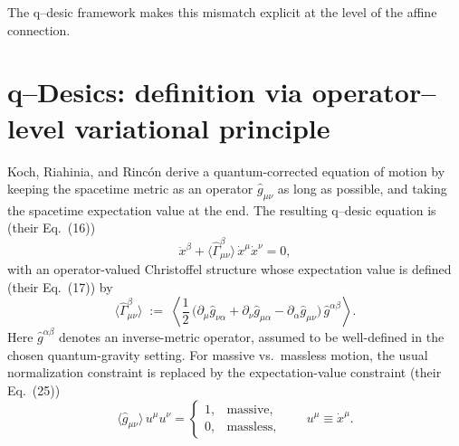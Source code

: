 \documentclass[11pt,a4paper]{article}
\theoremstyle{thmstyleone}
\theoremstyle{thmstyletwo}
\theoremstyle{thmstylethree}
\begin{document}
            The q--desic framework makes this mismatch explicit at the level of the affine connection.

        \section{q--Desics: definition via operator--level variational principle}
            Koch, Riahinia, and Rinc\'on derive a quantum-corrected equation of motion by keeping the spacetime metric as an operator
            $\hat g_{\mu\nu}$ as long as possible, and taking the spacetime expectation value at the end.
            The resulting q--desic equation is (their Eq.\ (16))
            \begin{equation}
                \ddot x^\beta + \big\langle \hat\Gamma^\beta_{\mu\nu}\big\rangle\,\dot x^\mu \dot x^\nu = 0,
                \label{eq:qdesic}
            \end{equation}
            with an operator-valued Christoffel structure whose expectation value is defined (their Eq.\ (17)) by
            \begin{equation}
                \big\langle \hat\Gamma^\beta_{\mu\nu}\big\rangle
                \;:=\;
                \left\langle
                    \frac{1}{2}\,
                    \big(\partial_\mu \hat g_{\nu\alpha} + \partial_\nu \hat g_{\mu\alpha} - \partial_\alpha \hat g_{\mu\nu}\big)\,
                    \hat g^{\alpha\beta}
                \right\rangle.
                \label{eq:Gammahat_def}
            \end{equation}
            Here $\hat g^{\alpha\beta}$ denotes an inverse-metric operator, assumed to be well-defined in the chosen quantum-gravity setting.
            For massive vs.\ massless motion, the usual normalization constraint is replaced by the expectation-value constraint (their Eq.\ (25))
            \begin{equation}
                \langle \hat g_{\mu\nu}\rangle\,u^\mu u^\nu =
                \begin{cases}
                    1, & \text{massive},\\
                    0, & \text{massless},
                \end{cases}
                \qquad u^\mu \equiv \dot x^\mu.
                \label{eq:mass_shell}
            \end{equation}
\end{document}
